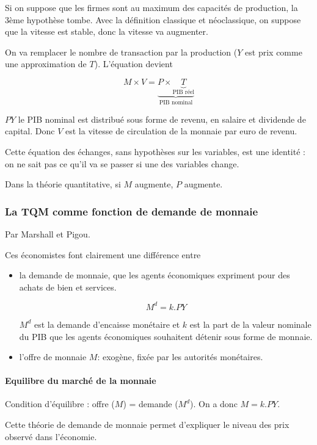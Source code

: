 	Si on suppose que les firmes sont au maximum des capacités de production, la 3ème hypothèse tombe. Avec la définition classique et néoclassique, on suppose que la vitesse est stable, donc la vitesse va augmenter.
	
	On va remplacer le nombre de transaction par la production ($Y$ est prix comme une approximation de $T$). L'équation devient
	
	$$M \times V = \underbrace{P \times \underbrace{T}_{\text{PIB réel}}}_{\text{PIB nominal}}$$
	
	$PY$ le PIB nominal est distribué sous forme de revenu, en salaire et dividende de capital. Donc $V$ est la vitesse de circulation de la monnaie par euro de revenu.
	
	Cette équation des échanges, sans hypothèses sur les variables, est une identité : on ne sait pas ce qu'il va se passer si une des variables change.
	
	Dans la théorie quantitative, si $M$ augmente, $P$ augmente.
	
	
	\subsubsection{La TQM comme fonction de demande de monnaie}
	
	Par Marshall et Pigou.
	
	Ces économistes font clairement une différence entre
	
	\begin{itemize}
		\item la demande de monnaie, que les agents économiques expriment pour des achats de bien et services.
		
		$$M^d =k.PY$$
		
		$M^d$ est la demande d'encaisse monétaire et $k$ est la part de la valeur nominale du PIB que les agents économiques souhaitent détenir sous forme de monnaie.
		
		\item l'offre de monnaie $M$: exogène, fixée par les autorités monétaires.
	\end{itemize}
	
	\paragraph{Equilibre du marché de la monnaie} Condition d'équilibre : offre ($M$) = demande ($M^d$). On a donc $M = k.PY$.
	
	Cette théorie de demande de monnaie permet d'expliquer le niveau des prix observé dans l'économie.
	
